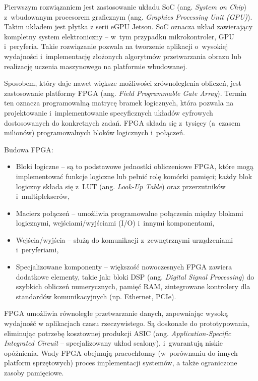 \vspace{11px}

Pierwszym rozwiązaniem jest zastosowanie układu SoC (ang. \textit{System on Chip}) z~wbudowanym procesorem graficznym (ang. \textit{Graphics Processing Unit (GPU)}). Takim układem jest płytka z serii eGPU Jetson. SoC oznacza układ zawierający kompletny system elektroniczny -- w~tym przypadku mikrokontroler, GPU i~peryferia. Takie rozwiązanie pozwala na tworzenie aplikacji o~wysokiej wydajności i~implementację złożonych algorytmów przetwarzania obrazu lub realizację uczenia maszynowego na platformie wbudowanej.

\vspace{11px}

Sposobem, który daje nawet większe możliwości zrównoleglenia obliczeń, jest zastosowanie platformy FPGA (ang. \textit{Field Programmable Gate Array}). Termin ten oznacza programowalną matrycę bramek logicznych, która pozwala na projektowanie i~implementowanie specyficznych układów cyfrowych dostosowanych do konkretnych zadań. FPGA składa się z~tysięcy (a~czasem milionów) programowalnych bloków logicznych i~połączeń.

\vspace{11px}
Budowa FPGA:
\begin{itemize}
    \item Bloki logiczne -- są to podstawowe jednostki obliczeniowe FPGA, które mogą implementować funkcje logiczne lub pełnić rolę komórki pamięci; każdy blok logiczny składa się z~LUT (ang. \textit{Look-Up Table}) oraz przerzutników i~multiplekserów,
    \item Macierz połączeń -- umożliwia programowalne połączenia między blokami logicznymi, wejściami/wyjściami (I/O) i~innymi komponentami,
    \item Wejścia/wyjścia -- służą do komunikacji z~zewnętrznymi urządzeniami i~peryferiami,
    \item Specjalizowane komponenty -- większość nowoczesnych FPGA zawiera dodatkowe elementy, takie jak: bloki DSP (ang. \textit{Digital Signal Processing}) do szybkich obliczeń numerycznych, pamięć RAM, zintegrowane kontrolery dla standardów komunikacyjnych (np. Ethernet, PCIe).
\end{itemize}

FPGA umożliwia równoległe przetwarzanie danych, zapewniając wysoką wydajność w aplikacjach czasu rzeczywistego. Są doskonałe do prototypowania, eliminując potrzebę kosztownej produkcji ASIC (ang. \textit{Application-Specific Integrated Circuit} -- specjalizowany układ scalony), i~gwarantują niskie opóźnienia. Wady FPGA obejmują pracochłonny (w~porównaniu do innych platform sprzętowych) proces implementacji systemów, a także ograniczone zasoby pamięciowe.



